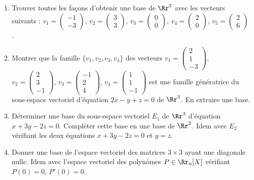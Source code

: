 \documentclass[class=report,crop=false]{standalone}
\begin{document}
\begin{miniexercices}
\sauteligne
\begin{enumerate}
  \item Trouver toutes les façons d'obtenir une base de $\Rr^2$
  avec les vecteurs suivants :
  $v_1=\left(\begin{smallmatrix}-1\\-3\end{smallmatrix}\right)$,
  $v_2=\left(\begin{smallmatrix}3\\3\end{smallmatrix}\right)$,
  $v_3=\left(\begin{smallmatrix}0\\0\end{smallmatrix}\right)$,
  $v_4=\left(\begin{smallmatrix}2\\0\end{smallmatrix}\right)$,
  $v_5=\left(\begin{smallmatrix}2\\6\end{smallmatrix}\right)$.


  \item Montrer que la famille $\{ v_1, v_2, v_3, v_4\}$ des vecteurs
  $v_1=\left(\begin{smallmatrix}2\\1\\-3\end{smallmatrix}\right)$,
  $v_2=\left(\begin{smallmatrix}2\\3\\-1\end{smallmatrix}\right)$,
  $v_3=\left(\begin{smallmatrix}-1\\2\\4\end{smallmatrix}\right)$,
  $v_4=\left(\begin{smallmatrix}1\\1\\-1\end{smallmatrix}\right)$
  est une famille génératrice du sous-espace vectoriel d'équation $2x-y+z=0$ de $\Rr^3$.
  En extraire une base.

  \item Déterminer une base du sous-espace vectoriel $E_1$ de $\Rr^3$ d'équation
  $x+3y-2z=0$. Compléter cette base en une base de $\Rr^3$.
  Idem avec $E_2$ vérifiant les deux équations $x+3y-2z=0$ et $y=z$.

  \item Donner une base de l'espace vectoriel des matrices $3\times 3$ ayant une diagonale
  nulle. Idem avec l'espace vectoriel des polynômes $P \in \Rr_n[X]$ vérifiant
  $P(0)=0$, $P'(0)=0$.

\end{enumerate}
\end{miniexercices}
\end{document}
